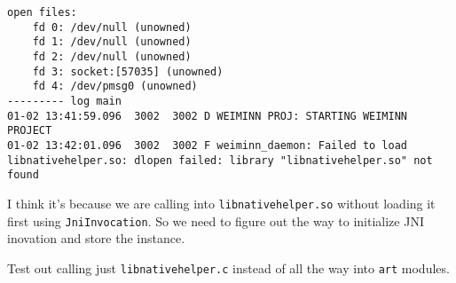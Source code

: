 \begin{lstlisting}
open files:
    fd 0: /dev/null (unowned)
    fd 1: /dev/null (unowned)
    fd 2: /dev/null (unowned)
    fd 3: socket:[57035] (unowned)
    fd 4: /dev/pmsg0 (unowned)
--------- log main
01-02 13:41:59.096  3002  3002 D WEIMINN PROJ: STARTING WEIMINN PROJECT
01-02 13:42:01.096  3002  3002 F weiminn_daemon: Failed to load libnativehelper.so: dlopen failed: library "libnativehelper.so" not found    
\end{lstlisting}
I think it's because we are calling into \texttt{libnativehelper.so} without loading it first using \texttt{JniInvocation}. So we need to figure out the way to initialize JNI inovation and store the instance.

Test out calling just \texttt{libnativehelper.c} instead of all the way into \texttt{art} modules.



